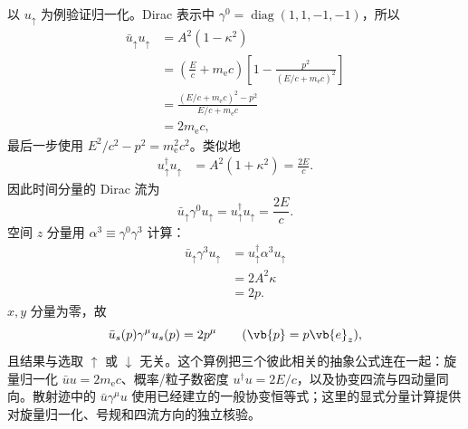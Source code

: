 \begin{exbox}[沿 $z$ 方向运动的电子]
以 $u_\uparrow$ 为例验证归一化。Dirac 表示中 $\gamma^0=\operatorname{diag}(1,1,-1,-1)$，所以
\begin{align*}
 \bar u_\uparrow u_\uparrow
 &=A^2(1-\kappa^2)\\
 &=\left(\frac Ec+m_{\mathrm e} c\right)
 \left[1-\frac{p^2}{(E/c+m_{\mathrm e} c)^2}\right]\\
 &=\frac{(E/c+m_{\mathrm e} c)^2-p^2}{E/c+m_{\mathrm e} c}\\
 &=2m_{\mathrm e} c,
\end{align*}
最后一步使用 $E^2/c^2-p^2=m_{\mathrm e}^2c^2$。类似地
\begin{align*}
 u_\uparrow^\dagger u_\uparrow
 &=A^2(1+\kappa^2)
 =\frac{2E}{c}.
\end{align*}
因此时间分量的 Dirac 流为
\begin{equation*}
 \bar u_\uparrow\gamma^0u_\uparrow
 =u_\uparrow^\dagger u_\uparrow
 =\frac{2E}{c}.
\end{equation*}
空间 $z$ 分量用 $\alpha^3\equiv\gamma^0\gamma^3$ 计算：
\begin{align*}
 \bar u_\uparrow\gamma^3u_\uparrow
 &=u_\uparrow^\dagger\alpha^3u_\uparrow\\
 &=2A^2\kappa\\
 &=2p.
\end{align*}
$x,y$ 分量为零，故
\begin{equation}
 {\bar u_s(p)\gamma^\mu u_s(p)=2p^\mu}
 \qquad(\vb{p}=p\vb{e}_z),
 \label{eq:explicit-dirac-current-z-dp62}
\end{equation}
且结果与选取 $\uparrow$ 或 $\downarrow$ 无关。这个算例把三个彼此相关的抽象公式连在一起：旋量归一化 $\bar uu=2m_{\mathrm e} c$、概率/粒子数密度 $u^\dagger u=2E/c$，以及协变四流与四动量同向。散射迹中的 $\bar u\gamma^\mu u$ 使用已经建立的一般协变恒等式；这里的显式分量计算提供对旋量归一化、号规和四流方向的独立核验。
\end{exbox}

